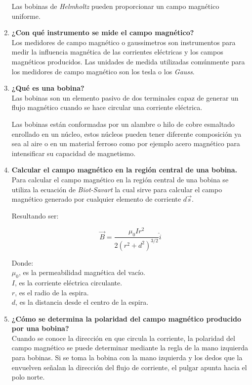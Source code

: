 \documentclass[letter,11pt]{article}
\begin{document}
\begin{enumerate}
Las bobinas de \emph{Helmholtz} pueden proporcionar un campo magnético
uniforme.

\item \textbf{¿Con qué instrumento se mide el campo magnético?} \\
Los medidores de campo magnético o gaussimetros son instrumentos para medir la
influencia magnética de las corrientes eléctricas y los campos magnéticos
producidos. Las unidades de medida utilizadas comúnmente para los medidores de
campo magnético son los tesla o los \emph{Gauss}.

\item \textbf{¿Qué es una bobina?} \\
Las bobinas son un elemento pasivo de dos terminales capaz de generar un flujo
magnético cuando se hace circular una corriente eléctrica.

Las bobinas están conformadas por un alambre o hilo de cobre esmaltado enrollado
en un núcleo, estos núcleos pueden tener diferente composición ya sea al aire o
en un material ferroso como por ejemplo acero magnético para intensificar su
capacidad de magnetismo.

\item \textbf{Calcular el campo magnético en la región central de una bobina.}
\\
Para calcular el campo magnético en la región central de una bobina se utiliza
la ecuación de \emph{Biot-Savart} la cual sirve para calcular el campo
magnético generado por cualquier elemento de corriente $d\vec{s}$.

Resultando ser:

\begin{equation*}
    \vec{B} = \frac{\mu_0 I r^2}{2 (r^2+d^2)^{3/2}} \hat{i}
\end{equation*}

Donde: \\
$\mu_0$, es la permeabilidad magnética del vacío. \\
$I$, es la corriente eléctrica circulante. \\
$r$, es el radio de la espira. \\
$d$, es la distancia desde el centro de la espira. \\

\item \textbf{¿Cómo se determina la polaridad del campo magnético producido por
una bobina?} \\
Cuando se conoce la dirección en que circula la corriente, la polaridad del
campo magnético se puede determinar mediante la regla de la mano izquierda para
bobinas. Si se toma la bobina con la mano izquierda y los dedos que la envuelven
señalan la dirección del flujo de corriente, el pulgar apunta hacia el polo
norte.
\end{enumerate}
\end{document}
